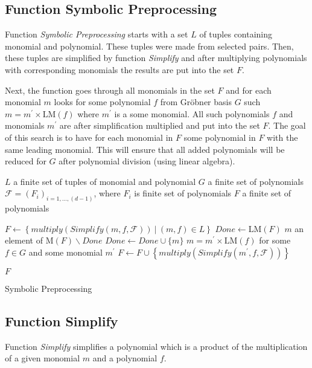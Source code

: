 \subsection{Function Symbolic Preprocessing}
Function \textit{Symbolic Preprocessing} starts with a set $L$ of tuples containing monomial and polynomial. These tuples were made from selected pairs. Then, these tuples are simplified by function \textit{Simplify} and after multiplying polynomials with corresponding monomials the results are put into the set $F$.

Next, the function goes through all monomials in the set $F$ and for each monomial $m$ looks for some polynomial $f$ from Gr\"obner basis $G$ such $m = m^\prime \times \textrm{LM}(f)$ where $m^\prime$ is a some monomial. All such polynomials $f$ and monomials $m^\prime$ are after simplification multiplied and put into the set $F$. The goal of this search is to have for each monomial in $F$ some polynomial in $F$ with the same leading monomial. This will ensure that all added polynomials will be reduced for $G$ after polynomial division (using linear algebra).

\begin{algorithm}[ht]
  \begin{algorithmic}[1]
    \Require
      \Statex $L$ a finite set of tuples of monomial and polynomial
      \Statex $G$ a finite set of polynomials
      \Statex $\mathcal{F} = (F_i)_{i=1,\ldots,(d-1)}$, where $F_i$ is finite set of polynomials
    \Ensure
      \Statex $F$ a finite set of polynomials
      \Statex

    \State $F \gets \left\{multiply(Simplify(m, f, \mathcal{F}))\ |\ (m, f)\in L\right\}$
    \State $Done \gets \textrm{LM}(F)$
      \State $m$ an element of $\textrm{M}(F)\backslash Done$
      \State $Done \gets Done \cup \{m\}$
        \State $m = m^\prime \times \textrm{LM}(f)$ for some $f \in G$ and some monomial $m^\prime$
        \State $F \gets F \cup \left\{multiply(Simplify(m^\prime, f, \mathcal{F}))\right\}$
      \EndIf
    \EndWhile

    \State \Return $F$

  \end{algorithmic}
  \caption{Symbolic Preprocessing}
\end{algorithm}

\subsection{Function Simplify}
Function \textit{Simplify} simplifies a polynomial which is a product of the multiplication of a given monomial $m$ and a polynomial $f$.

